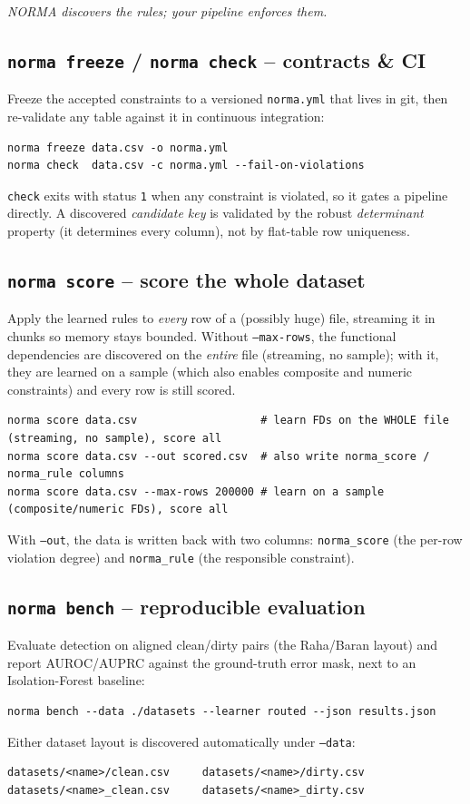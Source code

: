 \documentclass[11pt,a4paper]{article}
\newcommand{\code}[1]{\texttt{#1}}
\begin{document}
\noindent\emph{NORMA discovers the rules; your pipeline enforces them.}

\subsection{\code{norma freeze} / \code{norma check} -- contracts \& CI}
Freeze the accepted constraints to a versioned \code{norma.yml} that lives in git, then
re-validate any table against it in continuous integration:
\begin{lstlisting}
norma freeze data.csv -o norma.yml
norma check  data.csv -c norma.yml --fail-on-violations
\end{lstlisting}
\code{check} exits with status \code{1} when any constraint is violated, so it gates a
pipeline directly. A discovered \emph{candidate key} is validated by the robust
\emph{determinant} property (it determines every column), not by flat-table row uniqueness.

\subsection{\code{norma score} -- score the whole dataset}
Apply the learned rules to \emph{every} row of a (possibly huge) file, streaming it in
chunks so memory stays bounded. Without \code{--max-rows}, the functional dependencies are
discovered on the \emph{entire} file (streaming, no sample); with it, they are learned on a
sample (which also enables composite and numeric constraints) and every row is still scored.
\begin{lstlisting}
norma score data.csv                   # learn FDs on the WHOLE file (streaming, no sample), score all
norma score data.csv --out scored.csv  # also write norma_score / norma_rule columns
norma score data.csv --max-rows 200000 # learn on a sample (composite/numeric FDs), score all
\end{lstlisting}
With \code{--out}, the data is written back with two columns: \code{norma\_score} (the
per-row violation degree) and \code{norma\_rule} (the responsible constraint).

\subsection{\code{norma bench} -- reproducible evaluation}
Evaluate detection on aligned clean\slash dirty pairs (the Raha\slash Baran layout) and report
AUROC\slash AUPRC against the ground-truth error mask, next to an Isolation-Forest baseline:
\begin{lstlisting}
norma bench --data ./datasets --learner routed --json results.json
\end{lstlisting}
Either dataset layout is discovered automatically under \code{--data}:
\begin{lstlisting}
datasets/<name>/clean.csv     datasets/<name>/dirty.csv
datasets/<name>_clean.csv     datasets/<name>_dirty.csv
\end{lstlisting}
\end{document}
